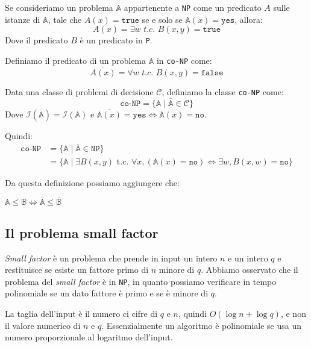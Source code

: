 Se consideriamo un problema $\mathbb{A}$ appartenente a \texttt{NP} come un predicato $A$ sulle istanze di 
$\mathbb{A}$, tale che $A(x) = \texttt{true}$ se e solo se $\mathbb{A}(x) = \texttt{yes}$, allora:
\[
  A(x) = \exists w \textit{ t.c. } B(x, y) = \texttt{true}
\]
Dove il predicato $B$ è un predicato in \texttt{P}.

Definiamo il predicato di un problema $\mathbb{A}$ in \texttt{co-NP} come:
\[
  \overline{A(x)} = \forall w \textit{ t.c. } B(x, y) = \texttt{false}
\]

\begin{tcolorbox}[title = Problema \texttt{co-NP}]
    Data una classe di problemi di decisione $\mathcal{C}$, definiamo la classe \texttt{co-NP} come:
    \[
        \texttt{co-NP} = \{ \mathbb{A} \mid \overline{\mathbb{A}} \in \mathcal{C} \}
    \]
    Dove $\mathcal{I}(\overline{\mathbb{A}}) = \mathcal{I}(\mathbb{A})$ e 
    $\overline{\mathbb{A}(x)} = \texttt{yes} \iff \mathbb{A}(x) = \texttt{no}$.
    
    Quindi:
    \[
        \begin{aligned}
        \texttt{co-NP} &= \{ \mathbb{A} \mid \overline{\mathbb{A}} \in \texttt{NP} \} \\
                       &= \{ \mathbb{A} \mid \exists B(x, y) \text{ t.c. } \forall x, (\mathbb{A}(x) = \texttt{no}) \iff \exists w, B(x, w) = \texttt{no} \}
        \end{aligned}
    \]
\end{tcolorbox}
Da questa definizione possiamo aggiungere che:

\begin{theorem}
    $\mathbb{A} \leq \mathbb{B} \iff \overline{\mathbb{A}} \leq \overline{\mathbb{B}}$
\end{theorem}

\subsection{Il problema small factor}
\textit{Small factor} è un problema che prende in input un intero $n$ e un intero $q$ e restituisce 
se esiste un fattore primo di $n$ minore di $q$. 
Abbiamo osservato che il problema del \textit{small factor} è in \texttt{NP}, in quanto possiamo
verificare in tempo polinomiale se un dato fattore è primo e se è minore di $q$.

La taglia dell'input è il numero ci cifre di $q$ e $n$, quindi $O(\log n + \log q)$, e non il valore 
numerico di $n$ e $q$. Essenzialmente un algoritmo è polinomiale se usa un numero proporzionale al
logaritmo dell'input.

